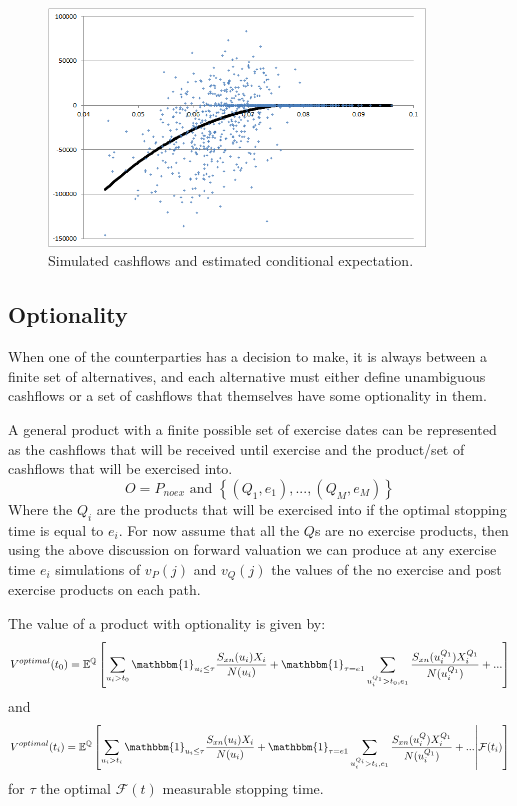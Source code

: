\documentclass[a4paper,10pt]{article}
\newcommand{\E}{\mathbb{E}}                 %
\newcommand{\Q}{\mathbb{Q}}                 %
\begin{document}
\begin{figure}
	\centering
		\includegraphics[width=100mm]{ConditionalExpectationEx1.png}
	\caption{Simulated cashflows and estimated conditional expectation.}	
	\label{fig:ConditionalExpectationEx1}
\end{figure}

\subsection{Optionality}
When one of the counterparties has a decision to make, it is always between a finite set of alternatives, and each alternative must either define unambiguous cashflows or a set of cashflows that themselves have some optionality in them.

A general product with a finite possible set of exercise dates can be represented as the cashflows that will be received until exercise and the product/set of cashflows that will be exercised into.
\begin{equation}
O = P_{noex} \text{ and } \left\{ \left(Q_1, e_1\right), ..., \left(Q_M, e_M\right) \right\}
\end{equation}
Where the $Q_i$ are the products that will be exercised into if the optimal stopping time is equal to $e_i$.  For now assume that all the $Q$s are no exercise products, then using the above discussion on forward valuation we can produce at any exercise time $e_i$ simulations of $v_P(j)$ and $v_Q(j)$ the values of the no exercise and post exercise products on each path.

The value of a product with optionality is given by:
\begin{equation}
V^{optimal}(t_0) = \E^\Q\left[ \sum_{u_i>t_0}\mathbbm{1}_{u_i\leq\tau}{\frac{S_{xn}(u_i)X_i}{N(u_i)}}  + 
\mathbbm{1}_{\tau=e1}\sum_{u_i^{Q_1}>t_0, e_1}{\frac{S_{xn}(u_i^{Q_1})X^{Q_1}_i}{N(u^{Q_1}_i)}} + ...
\right]
\end{equation}
and 
\begin{equation}
V^{optimal}(t_i) = \E^\Q\left[ \sum_{u_i>t_i}\mathbbm{1}_{u_i\leq\tau}{\frac{S_{xn}(u_i)X_i}{N(u_i)}}  + 
\mathbbm{1}_{\tau=e1}\sum_{u_i^{Q_i}>t_i,e_1}{\frac{S_{xn}(u_i^Q)X^{Q_1}_i}{N(u^{Q_1}_i)}} + ...
\middle| \mathcal{F}(t_i)\right]
\label{eq:fwdvalue2}
\end{equation}
for $\tau$ the optimal $\mathcal{F}(t)$ measurable stopping time.
\end{document}
